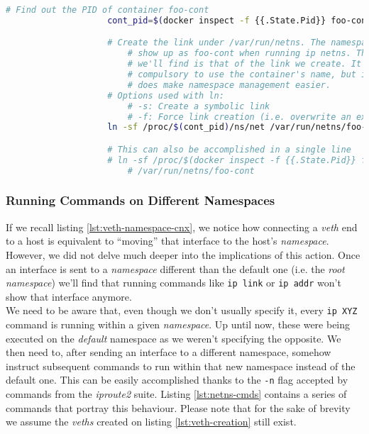                 \begin{lstlisting}[language = bash, caption = Linking a Container's Network Namespace to \texttt{/var/run/netns}., label = lst:ns-link]
                    # Find out the PID of container foo-cont
                    cont_pid=$(docker inspect -f {{.State.Pid}} foo-cont)

                    # Create the link under /var/run/netns. The namespace will
                        # show up as foo-cont when running ip netns. The name
                        # we'll find is that of the link we create. It is NOT
                        # compulsory to use the container's name, but it
                        # does make namespace management easier.
                    # Options used with ln:
                        # -s: Create a symbolic link
                        # -f: Force link creation (i.e. overwrite an existing link)
                    ln -sf /proc/$(cont_pid)/ns/net /var/run/netns/foo-cont

                    # This can also be accomplished in a single line
                    # ln -sf /proc/$(docker inspect -f {{.State.Pid}} foo-cont)/ns/net\ 
                        # /var/run/netns/foo-cont
                \end{lstlisting}

            \subsubsection{Running Commands on Different Namespaces}
                If we recall listing \ref{lst:veth-namespace-cnx}, we notice how connecting a \textit{veth} end to a host is equivalent to ``moving'' that interface to the host's \textit{namespace}. However, we did not delve much deeper into the implications of this action. Once an interface is sent to a \textit{namespace} different than the default one (i.e. the \textit{root namespace}) we'll find that running commands like \texttt{ip link} or \texttt{ip addr} won't show that interface anymore.\\

                We need to be aware that, even though we don't usually specify it, every \texttt{ip XYZ} command is running within a given \textit{namespace}. Up until now, these were being executed on the \textit{default} namespace as we weren't specifying the opposite. We then need to, after sending an interface to a different namespace, somehow instruct subsequent commands to run within that new namespace instead of the default one. This can be easily accomplished thanks to the \texttt{-n} flag accepted by commands from the \textit{iproute2} suite. Listing \ref{lst:netns-cmds} contains a series of commands that portray this behaviour. Please note that for the sake of brevity we assume the \textit{veths} created on listing \ref{lst:veth-creation} still exist.\\

